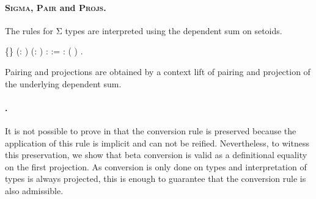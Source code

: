   \paragraph{\textsc{Sigma}, \textsc{Pair} and \textsc{Projs}.}
  The rules for Σ types are interpreted using the 
  dependent sum \coqdocdefinition{$\Sigma$} on setoids.  
\begin{coqdoccode}
\coqdocemptyline
\coqdocnoindent
{}  \{\} (: ) (: ) \coqdoceol
\coqdocindent{1.00em}
:   := \coqdocnotation{(} \coqdocvar{$\gamma$}: \coqdocnotation{[}\coqdocnotation{]} \coqdocdefinition{$\Sigma$} ( \coqdocnotation{$\star$} \coqdocvariable{$\gamma$})\coqdocnotation{;}   \coqdocnotation{)}.\coqdoceol
\coqdocemptyline
\end{coqdoccode}
\noindent Pairing and projections are obtained
  by a context lift of pairing and projection of the underlying dependent sum.
\begin{coqdoccode}
\coqdocemptyline
\coqdocemptyline
\end{coqdoccode}
  \paragraph{.}
  It is not possible to prove in \Coq that the conversion rule is
  preserved because the application of this rule is implicit and
  can not be reified. Nevertheless, to witness this preservation, 
  we show that beta conversion is valid as a definitional equality
  on the first projection. As conversion is only done on 
  types and interpretation of types is always projected, this is 
  enough to guarantee that the conversion rule is also admissible.


